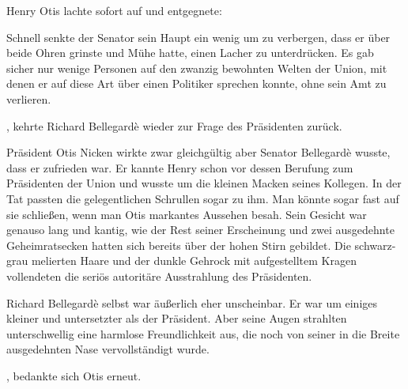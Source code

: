 \par

Henry Otis lachte sofort auf und entgegnete: 

\par

Schnell senkte der Senator sein Haupt ein wenig um zu verbergen, dass er über beide Ohren grinste und Mühe hatte, einen Lacher zu unterdrücken. Es gab sicher nur wenige Personen auf den zwanzig bewohnten Welten der Union, mit denen er auf diese Art über einen Politiker sprechen konnte, ohne sein Amt zu verlieren.

\par

, kehrte Richard Bellegardè wieder zur Frage des Präsidenten zurück. 

\par

Präsident Otis Nicken wirkte zwar gleichgültig aber Senator Bellegardè wusste, dass er zufrieden war. Er kannte Henry schon vor dessen Berufung zum Präsidenten der Union und wusste um die kleinen Macken seines Kollegen. In der Tat passten die gelegentlichen Schrullen sogar zu ihm. Man könnte sogar fast auf sie schließen, wenn man Otis markantes Aussehen besah. Sein Gesicht war genauso lang und kantig, wie der Rest seiner Erscheinung und zwei ausgedehnte Geheimratsecken hatten sich bereits über der hohen Stirn gebildet. Die schwarz-grau melierten Haare und der dunkle Gehrock mit aufgestelltem Kragen vollendeten die seriös autoritäre Ausstrahlung des Präsidenten.

\par

Richard Bellegardè selbst war äußerlich eher unscheinbar. Er war um einiges kleiner und untersetzter als der Präsident. Aber seine Augen strahlten unterschwellig eine harmlose Freundlichkeit aus, die noch von seiner in die Breite ausgedehnten Nase vervollständigt wurde.

\par

, bedankte sich Otis erneut.

